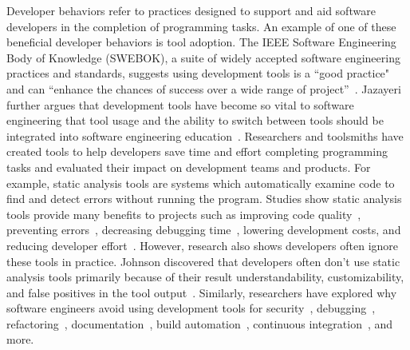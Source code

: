 Developer behaviors refer to practices designed to support and aid software developers in the completion of programming tasks. An example of one of these beneficial developer behaviors is tool adoption. The IEEE Software Engineering Body of Knowledge (SWEBOK), a suite of widely accepted software engineering practices and standards, suggests using development tools is a ``good practice" and can ``enhance the chances of success over a wide range of project”~\cite[p.~A-4]{SWEBOK}. Jazayeri further argues that development tools have become so vital to software engineering that tool usage and the ability to switch between tools should be integrated into software engineering education~\cite{jazayeri2004education}. Researchers and toolsmiths have created tools to help developers save time and effort completing programming tasks and evaluated their impact on development teams and products. For example, static analysis tools are systems which automatically examine code to find and detect errors without running the program. Studies show static analysis tools provide many benefits to projects such as improving code quality~\cite{GoogleFixit}, preventing errors~\cite{bessey2010few}, decreasing debugging time~\cite{Williams2007FaultFixTime}, lowering development costs, and reducing developer effort~\cite{singh2017staticreview}. However, research also shows developers often ignore these tools in practice. Johnson discovered that developers often don't use static analysis tools primarily because of their result understandability, customizability, and false positives in the tool output~\cite{Johnson2013Why}. Similarly, researchers have explored why software engineers avoid using development tools for security~\cite{Xiao2014Security},  debugging~\cite{Cao2010Debugging}, refactoring~\cite{Murphy-HillBarriersRefactoring}, documentation~\cite{Forward2002Documentation}, build automation~\cite{Akond2017BuildTools}, continuous integration~\cite{hilton2017CI}, and more. 

